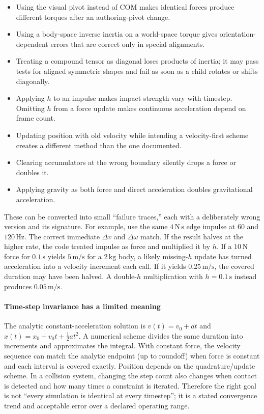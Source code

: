 \begin{itemize}
\tightlist
\item
  Using the visual pivot instead of COM makes identical forces produce different torques after an authoring-pivot change.
\item
  Using a body-space inverse inertia on a world-space torque gives orientation-dependent errors that are correct only in special alignments.
\item
  Treating a compound tensor as diagonal loses products of inertia; it may pass tests for aligned symmetric shapes and fail as soon as a child rotates or shifts diagonally.
\item
  Applying \(h\) to an impulse makes impact strength vary with timestep. Omitting \(h\) from a force update makes continuous acceleration depend on frame count.
\item
  Updating position with old velocity while intending a velocity-first scheme creates a different method than the one documented.
\item
  Clearing accumulators at the wrong boundary silently drops a force or doubles it.
\item
  Applying gravity as both force and direct acceleration doubles gravitational acceleration.
\end{itemize}

These can be converted into small ``failure traces,'' each with a deliberately wrong version and its signature. For example, use the same \(4\,\mathrm{N\,s}\) edge impulse at \(60\) and \(120\,\mathrm{Hz}\). The correct immediate \(\Delta v\) and \(\Delta\omega\) match. If the result halves at the higher rate, the code treated impulse as force and multiplied it by \(h\). If a \(10\,\mathrm N\) force for \(0.1\,\mathrm s\) yields \(5\,\mathrm{m/s}\) for a \(2\,\mathrm{kg}\) body, a likely missing-\(h\) update has turned acceleration into a velocity increment each call. If it yields \(0.25\,\mathrm{m/s}\), the covered duration may have been halved. A double-\(h\) multiplication with \(h=0.1\,\mathrm s\) instead produces \(0.05\,\mathrm{m/s}\).

\paragraph{Time-step invariance has a limited meaning}\label{time-step-invariance-has-a-limited-meaning}

The analytic constant-acceleration solution is \(v(t)=v_0+at\) and \(x(t)=x_0+v_0t+\tfrac12at^2\). A numerical scheme divides the same duration into increments and approximates the integral. With constant force, the velocity sequence can match the analytic endpoint (up to roundoff) when force is constant and each interval is covered exactly. Position depends on the quadrature/update scheme. In a collision system, changing the step count also changes when contact is detected and how many times a constraint is iterated. Therefore the right goal is not ``every simulation is identical at every timestep''; it is a stated convergence trend and acceptable error over a declared operating range.

